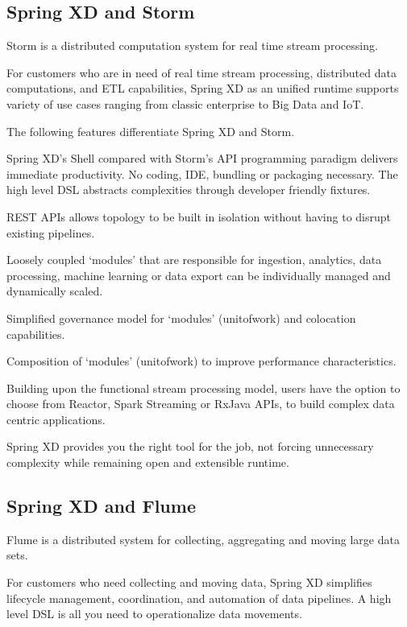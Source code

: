 \subsection{Spring XD and Storm}
Storm is a distributed computation system for real time stream processing.

For customers who are in need of real time stream processing, distributed data computations, and ETL capabilities, Spring XD as an unified runtime supports variety of use cases ranging from classic enterprise to Big Data and IoT. 

The following features differentiate Spring XD and Storm.

\begin{itemize*}
\item Spring XD's Shell compared with Storm's API programming paradigm delivers immediate productivity. No coding, IDE, bundling or packaging necessary. The high level DSL abstracts complexities through developer friendly fixtures.
\item REST APIs allows topology to be built in isolation without having to disrupt existing pipelines.
\item Loosely coupled `modules' that are responsible for ingestion, analytics, data processing, machine learning or data export can be individually managed and dynamically scaled.
\item Simplified governance model for `modules' (unit\-of\-work) and colocation capabilities.
\item Composition of `modules' (unit\-of\-work) to improve performance characteristics. 
\item Building upon the functional stream processing model, users have the option to choose from Reactor\cite{reactor}, Spark Streaming or RxJava APIs, to build complex data centric applications.
\end{itemize*}

Spring XD provides you the right tool for the job, not forcing unnecessary complexity while remaining open and extensible runtime.

\subsection{Spring XD and Flume}
Flume is a distributed system for collecting, aggregating and moving large data sets. 

For customers who need collecting and moving data, Spring XD simplifies lifecycle management, coordination, and automation of data pipelines. A high level DSL is all you need to operationalize data movements. 

